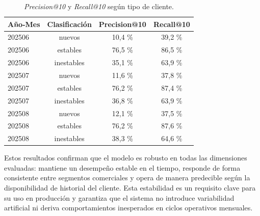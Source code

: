 \begin{table}[H]
\centering
\caption[Desempeño por clasificación de cliente]{\textit{Precision@10} y \textit{Recall@10} según tipo de cliente.}
\begin{tabular}{lccc}
\toprule
\textbf{Año-Mes} & \textbf{Clasificación} & \textbf{Precision@10} & \textbf{Recall@10} \\
\midrule
202506 & nuevos      & 10{,}4 \% & 39{,}2 \% \\
202506 & estables   & 76{,}5 \% & 86{,}5 \% \\
202506 & inestables & 35{,}1 \% & 63{,}9 \% \\
202507 & nuevos      & 11{,}6 \% & 37{,}8 \% \\
202507 & estables   & 76{,}2 \% & 87{,}4 \% \\
202507 & inestables & 36{,}8 \% & 63{,}9 \% \\
202508 & nuevos      & 12{,}1 \% & 37{,}5 \% \\
202508 & estables   & 76{,}2 \% & 87{,}6 \% \\
202508 & inestables & 38{,}3 \% & 64{,}6 \% \\
\bottomrule
\end{tabular}
\label{tab:robustez_clasificacion}
\end{table}

Estos resultados confirman que el modelo es robusto en todas las dimensiones evaluadas: mantiene un desempeño estable en el tiempo, responde de forma consistente entre segmentos comerciales y opera de manera predecible según la disponibilidad de historial del cliente. Esta estabilidad es un requisito clave para su uso en producción y garantiza que el sistema no introduce variabilidad artificial ni deriva comportamientos inesperados en ciclos operativos mensuales.
